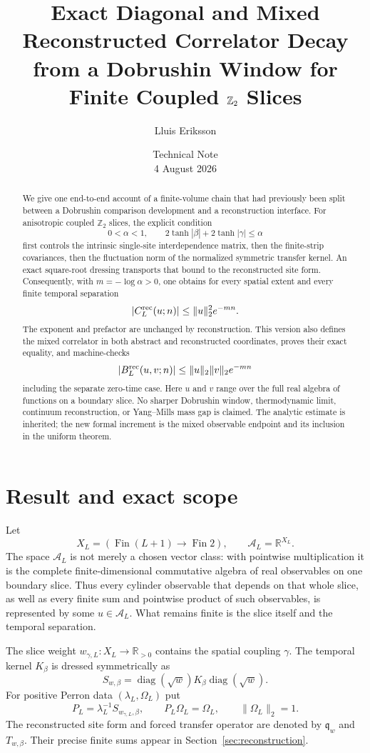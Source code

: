 \documentclass[11pt]{article}
\title{Exact Diagonal and Mixed Reconstructed Correlator Decay\\
from a Dobrushin Window for Finite Coupled $\Z_2$ Slices}
\author{Lluis Eriksson}
\date{Technical Note\\4 August 2026}
\theoremstyle{definition}
\theoremstyle{remark}
\newcommand{\R}{\mathbb{R}}
\newcommand{\Z}{\mathbb{Z}}
\newcommand{\cA}{\mathcal{A}}
\newcommand{\diag}{\operatorname{diag}}
\begin{document}
\maketitle

\begin{abstract}
We give one end-to-end account of a finite-volume chain that had previously
been split between a Dobrushin comparison development and a reconstruction
interface.  For anisotropic coupled $\Z_2$ slices, the explicit condition
\[
  0<\alpha<1,
  \qquad 2\tanh|\beta|+2\tanh|\gamma|\leq\alpha
\]
first controls the intrinsic single-site interdependence matrix, then the
finite-strip covariances, then the fluctuation norm of the normalized symmetric
transfer kernel.  An exact square-root dressing transports that bound to the
reconstructed site form.  Consequently, with $m=-\log\alpha>0$, one obtains
for every spatial extent and every finite temporal separation
\[
  |C^{\rm rec}_L(u;n)|\leq \|u\|_2^2 e^{-mn}.
\]
The exponent and prefactor are unchanged by reconstruction.  This version
also defines the mixed correlator in both abstract and reconstructed
coordinates, proves their exact equality, and machine-checks
\[
  |B^{\rm rec}_L(u,v;n)|\leq \|u\|_2\|v\|_2 e^{-mn}
\]
including the separate zero-time case.  Here $u$ and $v$ range over the full
real algebra of functions on a boundary slice.  No sharper Dobrushin
window, thermodynamic limit, continuum reconstruction, or Yang--Mills mass gap
is claimed.  The analytic estimate is inherited; the new formal increment is
the mixed observable endpoint and its inclusion in the uniform theorem.
\end{abstract}

\section{Result and exact scope}

Let
\[
  X_L=(\operatorname{Fin}(L+1)\to\operatorname{Fin}2),
  \qquad \cA_L=\R^{X_L}.
\]
The space $\cA_L$ is not merely a chosen vector class: with pointwise
multiplication it is the complete finite-dimensional commutative algebra of
real observables on one boundary slice.  Thus every cylinder observable that
depends on that whole slice, as well as every finite sum and pointwise product
of such observables, is represented by some $u\in\cA_L$.  What remains finite
is the slice itself and the temporal separation.

The slice weight $w_{\gamma,L}:X_L\to\R_{>0}$ contains the spatial coupling
$\gamma$.  The temporal kernel $K_\beta$ is dressed symmetrically as
\[
  S_{w,\beta}=\diag(\sqrt w)K_\beta\diag(\sqrt w).
\]
For positive Perron data $(\lambda_L,\Omega_L)$ put
\[
  P_L=\lambda_L^{-1}S_{w_{\gamma,L},\beta},
  \qquad P_L\Omega_L=\Omega_L,
  \qquad \|\Omega_L\|_2=1.
\]
The reconstructed site form and forced transfer operator are denoted by
$\mathfrak q_w$ and $T_{w,\beta}$.  Their precise finite sums appear in
Section~\ref{sec:reconstruction}.
\end{document}
